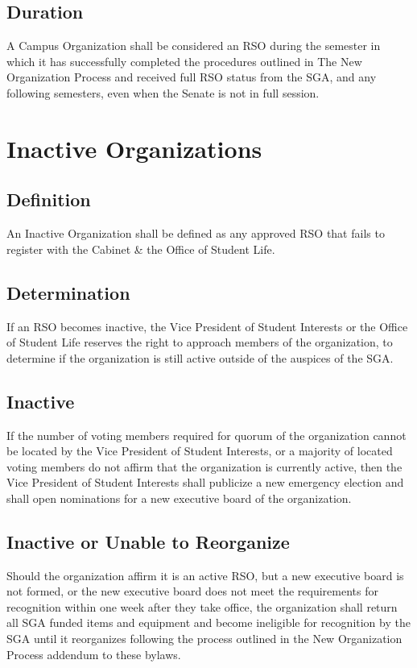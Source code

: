 \documentclass[12pt]{scrreprt}
\begin{document}
\subsection{Duration}
A Campus Organization shall be considered an RSO during the semester in which
it has successfully completed the procedures outlined in The New Organization Process and received full RSO status from the SGA, and any following semesters, even when the Senate is not in full session.

\section{Inactive Organizations}

\subsection{Definition}
An Inactive Organization shall be defined as any approved RSO that fails to 
register with the Cabinet \& the Office of Student Life.

\subsection{Determination}
If an RSO becomes inactive, the Vice President of Student Interests or the Office of Student Life reserves the right to approach members of the organization, to determine if the 
organization is still active outside of the auspices of the SGA.

\subsection{Inactive}
If the number of voting members required for quorum of the organization cannot 
be located by the Vice President of Student Interests, or a majority of located voting members do not affirm that the organization is currently active, then the Vice President of Student Interests shall publicize a new emergency election and shall open nominations for a new executive board of the organization.

\subsection{Inactive or Unable to Reorganize}
Should the organization affirm it is an active RSO, but a new executive board 
is not formed, or the new executive board does not meet the requirements for 
recognition within one week after they take office, the organization shall 
return all SGA funded items and equipment and become ineligible for 
recognition by the SGA until it reorganizes following the process outlined in the New Organization Process addendum to these bylaws.
\end{document}
